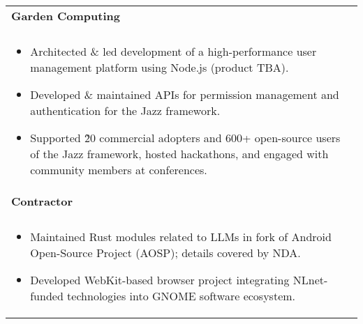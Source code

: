 \documentclass[letterpaper,10pt]{article} %
\begin{document}
\begin{tabular*}{\linewidth}{@{\extracolsep{\fill}} lr }

\textbf{Garden Computing} & \scriptsize\bfseries\color{sectioncolour}{San Francisco, CA}\\
\footnotesize\bfseries\color{sectioncolour}{Full-Stack Software Engineer} & \scriptsize\bfseries\color{sectioncolour}{February 2025 - Present}\\
\multicolumn{2}{p{\linewidth}}{
    \scriptsize{\vspace{-0.1in}\begin{itemize}[nosep]
        \item Architected \& led development of a high-performance user management platform using Node.js (product TBA).
        \item Developed \& maintained APIs for permission management and authentication for the Jazz framework.
        \item Supported \~20 commercial adopters and 600+ open-source users of the Jazz framework, hosted hackathons, and engaged with community members at conferences.
    \end{itemize}\vspace{-0.00in}}
}\\
\textbf{Contractor} & \scriptsize\bfseries\color{sectioncolour}{Remote}\\
\footnotesize\bfseries\color{sectioncolour}{Full-Stack Software Engineer} & \scriptsize\bfseries\color{sectioncolour}{August 2024 - February 2025}\\
\multicolumn{2}{p{\linewidth}}{
    \scriptsize{\vspace{-0.1in}\begin{itemize}[nosep]
        \item Maintained Rust modules related to LLMs in fork of Android Open-Source Project (AOSP); details covered by NDA\@.
        \item Developed WebKit-based browser project integrating NLnet-funded technologies into GNOME software ecosystem.
    \end{itemize}\vspace{-0.00in}}
}\\


\end{tabular*}
\end{document}
